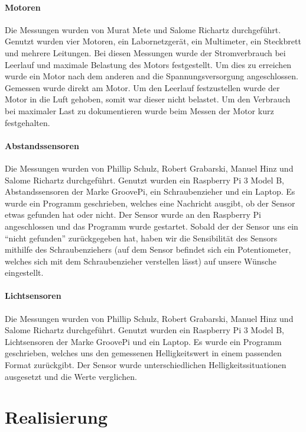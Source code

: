 \documentclass{report}
\begin{document}
\subsubsection{Motoren}

Die Messungen wurden von Murat Mete und Salome Richartz durchgef\"{u}hrt. Genutzt wurden vier Motoren, ein Labornetzger\"{a}t, ein Multimeter, ein Steckbrett und mehrere Leitungen. Bei diesen Messungen wurde der Stromverbrauch bei Leerlauf und maximale Belastung des Motors festgestellt. Um dies zu erreichen wurde ein Motor nach dem anderen and die Spannungsversorgung angeschlossen. Gemessen wurde direkt am Motor. Um den Leerlauf festzustellen wurde der Motor in die Luft gehoben, somit war dieser nicht belastet. Um den Verbrauch bei maximaler Last zu dokumentieren wurde beim Messen der Motor kurz festgehalten.

\subsubsection{Abstandssensoren}

Die Messungen wurden von Phillip Schulz, Robert Grabarski, Manuel Hinz und Salome Richartz durchgef\"{u}hrt. Genutzt wurden ein Raspberry Pi 3 Model B, Abstandssensoren der Marke GroovePi, ein Schraubenzieher und ein Laptop. Es wurde ein Programm geschrieben, welches eine Nachricht ausgibt, ob der Sensor etwas gefunden hat oder nicht. Der Sensor wurde an den Raspberry Pi angeschlossen und das Programm wurde gestartet. Sobald der der Sensor uns ein “nicht gefunden” zur\"{u}ckgegeben hat, haben wir die Sensibilit\"{a}t des Sensors mithilfe des Schraubenziehers (auf dem Sensor befindet sich ein Potentiometer, welches sich mit dem Schraubenzieher verstellen l\"{a}sst) auf unsere W\"{u}nsche eingestellt.

\subsubsection{Lichtsensoren}

Die Messungen wurden von Phillip Schulz, Robert Grabarski, Manuel Hinz und Salome Richartz durchgef\"{u}hrt. Genutzt wurden ein Raspberry Pi 3 Model B, Lichtsensoren der Marke GroovePi und ein Laptop. Es wurde ein Programm geschrieben, welches uns den gemessenen Helligkeitswert in einem passenden Format zur\"{u}ckgibt. Der Sensor wurde unterschiedlichen Helligkeitssituationen ausgesetzt und die Werte verglichen.


\chapter{Realisierung}
\end{document}

